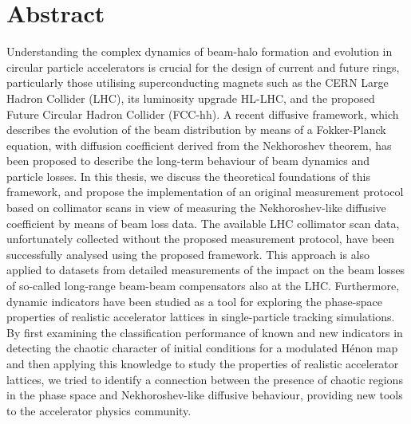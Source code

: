 \thispagestyle{empty}
\chapter*{Abstract} 

Understanding the complex dynamics of beam-halo formation and evolution in circular particle accelerators is crucial for the design of current and future rings, particularly those utilising superconducting magnets such as the CERN Large Hadron Collider (LHC), its luminosity upgrade HL-LHC, and the proposed Future Circular Hadron Collider (FCC-hh).
 A recent diffusive framework, which describes the evolution of the beam distribution by means of a Fokker-Planck equation, with diffusion coefficient derived from the Nekhoroshev theorem, has been proposed to describe the long-term behaviour of beam dynamics and particle losses.
 In this thesis, we discuss the theoretical foundations of this framework, and propose the implementation of an original measurement protocol based on collimator scans in view of measuring the Nekhoroshev-like diffusive coefficient by means of beam loss data.
 The available LHC collimator scan data, unfortunately collected without the proposed measurement protocol, have been successfully analysed using the proposed framework. This approach is also applied to datasets from detailed measurements of the impact on the beam losses of so-called long-range beam-beam compensators also at the LHC. 
 Furthermore, dynamic indicators have been studied as a tool for exploring the phase-space properties of realistic accelerator lattices in single-particle tracking simulations.
 By first examining the classification performance of known and new indicators in detecting the chaotic character of initial conditions for a modulated Hénon map and then applying this knowledge to study the properties of realistic accelerator lattices, we tried to identify a connection between the presence of chaotic regions in the phase space and Nekhoroshev-like diffusive behaviour, providing new tools to the accelerator physics community.


